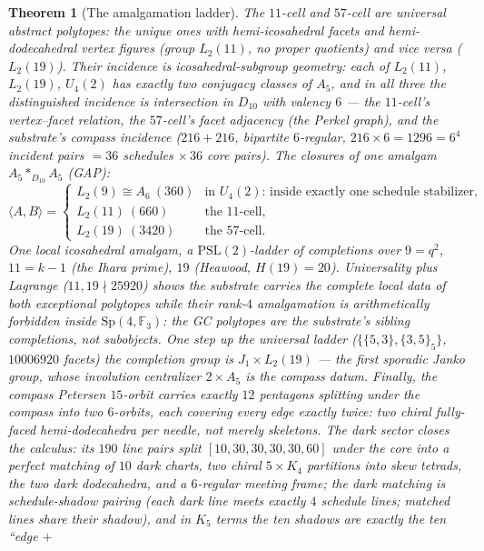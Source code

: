 \documentclass[11pt]{article}
\newtheorem{theorem}{Theorem}[section]
\newcommand{\GF}[1]{\mathbb{F}_{#1}}
\newcommand{\Sp}{\mathrm{Sp}}
\begin{document}
\begin{theorem}[The amalgamation ladder]
\label{thm:amalgam}
The $11$-cell and $57$-cell are \emph{universal} abstract polytopes:
the unique ones with hemi-icosahedral facets and hemi-dodecahedral
vertex figures (group $L_2(11)$, no proper quotients) and vice versa
($L_2(19)$).  Their incidence is icosahedral-subgroup geometry: each
of $L_2(11)$, $L_2(19)$, $U_4(2)$ has exactly two conjugacy classes
of $A_5$, and in all three the distinguished incidence is
\emph{intersection in $D_{10}$} with valency $6$ --- the $11$-cell's
vertex--facet relation, the $57$-cell's facet adjacency (the Perkel
graph), and the substrate's compass incidence ($216+216$, bipartite
$6$-regular, $216\times6=1296=6^4$ incident pairs $=36$ schedules
$\times\,36$ core pairs).  The closures of one amalgam
$A_5\ast_{D_{10}}A_5$ (GAP):
\[
\langle A,B\rangle=
\begin{cases}
L_2(9)\cong A_6\ (360) & \text{in } U_4(2)\text{: inside exactly one
schedule stabilizer,}\\
L_2(11)\ (660) & \text{the }11\text{-cell},\\
L_2(19)\ (3420) & \text{the }57\text{-cell}.
\end{cases}
\]
One local icosahedral amalgam, a $\mathrm{PSL}(2)$-ladder of
completions over $9=q^2$, $11=k-1$ (the Ihara prime), $19$ (Heawood,
$H(19)=20$).  Universality plus Lagrange ($11,19\nmid25920$) shows the
substrate carries the \emph{complete local data} of both exceptional
polytopes while their rank-$4$ amalgamation is arithmetically
forbidden inside $\Sp(4,\GF3)$: the GC polytopes are the substrate's
sibling completions, not subobjects.  One step up the universal
ladder ($\{\{5,3\},\{3,5\}_5\}$, $10006920$ facets) the completion
group is $J_1\times L_2(19)$ --- the first sporadic Janko group,
whose involution centralizer $2\times A_5$ \emph{is} the compass
datum.  Finally, the compass Petersen $15$-orbit carries exactly $12$
pentagons splitting under the compass into two $6$-orbits, each
covering every edge exactly twice: two \emph{chiral fully-faced}
hemi-dodecahedra per needle, not merely skeletons.
The dark sector closes the calculus: its $190$ line pairs split
$[10,30,30,30,30,60]$ under the core into a perfect matching of $10$
\emph{dark charts}, two chiral $5\times K_4$ partitions into skew
tetrads, the two dark dodecahedra, and a $6$-regular meeting frame;
the dark matching is \emph{schedule-shadow pairing} (each dark line
meets exactly $4$ schedule lines; matched lines share their shadow),
and in $K_5$ terms the ten shadows are exactly the ten ``edge $+$

\end{theorem}
\end{document}
